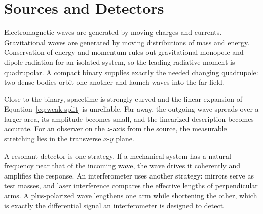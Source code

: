 \begin{classroomqa}
\end{classroomqa}

\section{Sources and Detectors}

Electromagnetic waves are generated by moving charges and currents.
Gravitational waves are generated by moving distributions of mass and
energy. Conservation of energy and momentum rules out gravitational
monopole and dipole radiation for an isolated system, so the leading
radiative moment is quadrupolar. A compact binary supplies exactly the
needed changing quadrupole: two dense bodies orbit one another and launch
waves into the far field.

Close to the binary, spacetime is strongly curved and the linear expansion
of Equation~\eqref{eq:weak-split} is unreliable. Far away, the outgoing wave
spreads over a larger area, its amplitude becomes small, and the linearized
description becomes accurate. For an observer on the \(z\)-axis from the
source, the measurable stretching lies in the transverse \(x\)-\(y\) plane.

\begin{classroomqa}
\end{classroomqa}

A resonant detector is one strategy. If a mechanical system has a natural
frequency near that of the incoming wave, the wave drives it coherently and
amplifies the response. An interferometer uses another strategy: mirrors
serve as test masses, and laser interference compares the effective lengths
of perpendicular arms. A plus-polarized wave lengthens one arm while
shortening the other, which is exactly the differential signal an
interferometer is designed to detect.

